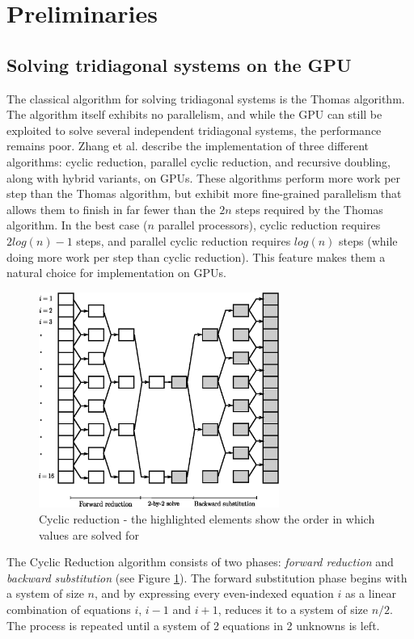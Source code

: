 \documentclass{elsarticle}
\begin{document}
\section{Preliminaries} \label{sec:preliminaries}


\subsection{Solving tridiagonal systems on the GPU}

The classical algorithm for solving tridiagonal systems is
the Thomas algorithm.
The algorithm itself exhibits no parallelism,
and while the GPU can still be exploited to solve
several independent tridiagonal systems,
the performance remains poor.
Zhang et al. \cite{Zhange2010FTS}
describe the implementation of three different algorithms:
cyclic reduction, parallel cyclic reduction, and
recursive doubling,
along with hybrid variants,
on GPUs.
These algorithms perform more work per step than
the Thomas algorithm,
but exhibit more fine-grained parallelism
that allows them to finish in
far fewer than the $2n$ steps required by the Thomas algorithm.
In the best case ($n$ parallel processors),
cyclic reduction requires 
$2log(n) - 1$ steps,
and parallel cyclic reduction requires
$log(n)$ steps
(while doing more work per step than cyclic reduction).
This feature makes them a natural choice for
implementation on GPUs.

\begin{figure}[h!]
\begin{center}
\includegraphics[height=200pt]{img/cyclic-reduction.eps}
\end{center}
\caption{Cyclic reduction - the highlighted elements
show the order in which values are solved for}
\label{fig:cyclic-reduction}
\end{figure}

The Cyclic Reduction algorithm consists of two phases:
\emph{forward reduction} and \emph{backward substitution}
(see Figure \ref{fig:cyclic-reduction}).
The forward substitution phase begins with a system of size $n$,
and by expressing every even-indexed equation $i$ as a linear
combination of equations $i$, $i-1$ and $i+1$, reduces it to a
system of size $n/2$.
The process is repeated until a system of 2 equations in 2 unknowns
is left.
\end{document}
